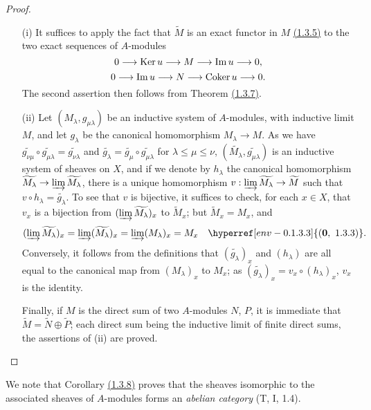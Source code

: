 \begin{proof}
\label{proof-cor-1.1.3.9}
\medskip\noindent
\begin{itemize}
  \item[(i)] It suffices to apply the fact that $\widetilde{M}$ is an exact functor in $M$
    \hyperref[prop-1.1.3.5]{(1.3.5)} to the two exact sequences of $A$-modules
    \[
      0\longrightarrow{\mathop{\mathrm{Ker}}\nolimits}\, u\longrightarrow M\longrightarrow{\mathop{\mathrm{Im}}\nolimits}\, u\longrightarrow 0,
    \]
    \[
      0\longrightarrow{\mathop{\mathrm{Im}}\nolimits}\, u\longrightarrow N\longrightarrow{\mathop{\mathrm{Coker}}\nolimits}\, u\longrightarrow 0.
    \]
    The second assertion then follows from Theorem \hyperref[thm-1.1.3.7]{(1.3.7)}.
  \item[(ii)] Let $(M_\lambda,g_{\mu\lambda})$ be an inductive system of $A$-modules, with
    inductive limit $M$, and let $g_\lambda$ be the canonical homomorphism
    $M_\lambda\to M$. As we have
    $\widetilde{g_{\nu\mu}}\circ\widetilde{g_{\mu\lambda}}=\widetilde{g_{\nu\lambda}}$
    and $\widetilde{g_\lambda}=\widetilde{g_\mu}\circ\widetilde{g_{\mu\lambda}}$ for
    $\lambda\leqslant\mu\leqslant\nu$,
    $(\widetilde{M_\lambda},\widetilde{g_{\mu\lambda}})$ is an inductive system of
    sheaves on $X$, and if we denote by $h_\lambda$ the canonical homomorphism
    $\widetilde{M_\lambda}\to\varinjlim\widetilde{M_\lambda}$, there is a unique
    homomorphism $v:\varinjlim\widetilde{M_\lambda}\to\widetilde{M}$ such that
    $v\circ h_\lambda=\widetilde{g_\lambda}$. To see that $v$ is bijective, it suffices
    to check, for each $x\in X$, that $v_x$ is a bijection from
    $(\varinjlim\widetilde{M_\lambda})_x$ to $\widetilde{M}_x$; but $\widetilde{M}_x=M_x$, and
    \[
      (\varinjlim\widetilde{M_\lambda})_x=\varinjlim(\widetilde{M_\lambda})_x
      =\varinjlim(M_\lambda)_x=M_x\quad\hyperref[env-0.1.3.3]{(\textbf{0},~1.3.3)}.
    \]
    Conversely, it follows from the definitions that $(\widetilde{g_\lambda})_x$ and
    $(h_\lambda)$ are all equal to the canonical map from $(M_\lambda)_x$ to $M_x$; as
    $(\widetilde{g_\lambda})_x=v_x\circ(h_\lambda)_x$, $v_x$ is the identity.

    Finally, if $M$ is the direct sum of two $A$-modules $N$, $P$, it is immediate that
    $\widetilde{M}=\widetilde{N}\oplus\widetilde{P}$; each direct sum being the inductive
    limit of finite direct sums, the assertions of (ii) are proved.
\end{itemize}
\end{proof}

We note that Corollary \hyperref[cor-1.1.3.8]{(1.3.8)} proves that the sheaves isomorphic to the associated sheaves
of $A$-modules forms an {\em abelian category} (T, I, 1.4).

